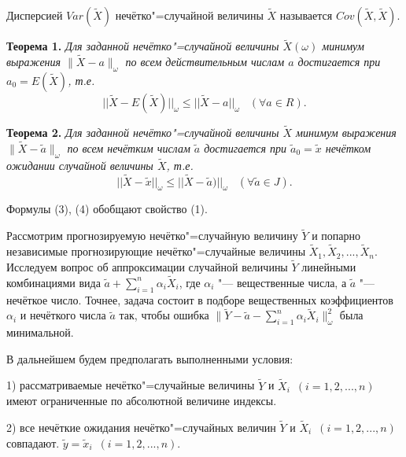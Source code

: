 Дисперсией $Var(\tilde{X})$ нечётко"=случайной величины $\tilde{X}$ называется $Cov(\tilde{X}, \tilde{X})$.



\textbf{Теорема 1.} \textit{Для заданной нечётко"=случайной величины $\tilde{X}(\omega)$ минимум выражения $\|\tilde{X} - a\|_{\omega} $ по всем действительным числам $a$ достигается при $a_0 = E(\tilde{X})$, т.е.}
\begin{equation}
||\tilde{X}-E(\tilde{X})||_{\omega}\leq ||\tilde{X}-a||_{\omega}\,\,\,\,\,(\forall a\in R).
\end{equation}

\textbf{Теорема 2. }\textit{Для заданной нечётко"=случайной величины $\tilde{X}$ минимум выражения $\|\tilde{X} - \tilde{a}\|_{\omega}$ по всем нечётким числам $\tilde{a}$ достигается при $\tilde{a}_0 = \tilde{x}$ нечётком ожидании случайной величины $\tilde{X}$, т.е.}
\begin{equation}
||\tilde{X}-\tilde{x}||_{\omega}\leq ||\tilde{X}-\tilde{a})||_{\omega}\,\,\,\,\,(\forall \tilde{a}\in J).
\end{equation}

Формулы (3), (4) обобщают свойство (1).

Рассмотрим прогнозируемую нечётко"=случайную величину $\tilde{Y}$ и попарно независимые прогнозирующие нечётко"=случайные величины $\tilde{X}_1, \tilde{X}_2,..., \tilde{X}_n$. Исследуем вопрос об аппроксимации случайной величины $\tilde{Y}$ линейными комбинациями вида $\tilde{a} + \sum\limits_{i=1}^n\alpha_i\tilde{X}_i$, где $\alpha_i$ "--- вещественные числа, а $ \tilde{a}$ "--- нечёткое число. Точнее, задача состоит в подборе вещественных коэффициентов $\alpha_i$ и нечёткого числа $\tilde{a}$ так, чтобы ошибка $\|\tilde{Y} - \tilde{a}- \sum\limits_{i=1}^n\alpha_i\tilde{X}_i\|_{\omega}^2$ была минимальной.

В дальнейшем будем предполагать выполненными условия:

1) рассматриваемые нечётко"=случайные величины $\tilde{Y}$ и $\tilde{X}_i$\,\,\,$(i = 1, 2,...,n)$ имеют ограниченные по абсолютной величине индексы.

2) все нечёткие ожидания нечётко"=случайных величин $\tilde{Y}$ и $\tilde{X}_i$\,\,\,$(i = 1, 2,...,n)$ совпадают. $\tilde{y} = \tilde{x}_i$\,\,\,$(i = 1, 2,..., n)$.


